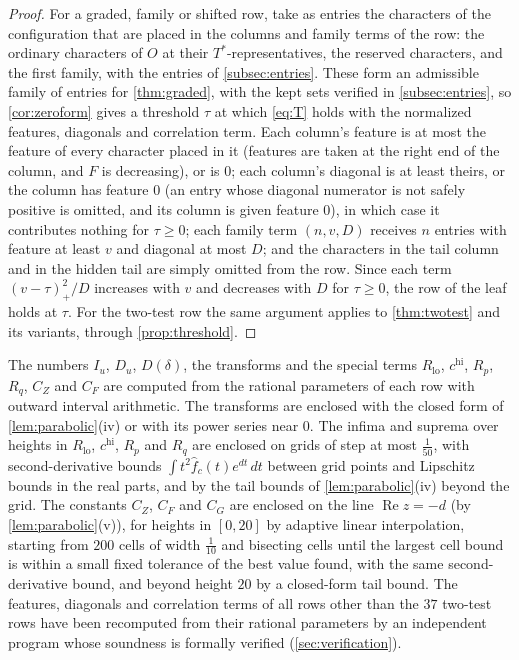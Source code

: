 \documentclass[11pt]{amsart}
\numberwithin{equation}{section}
\theoremstyle{plain}
\theoremstyle{definition}
\theoremstyle{remark}
\renewcommand{\Re}{\operatorname{Re}}
\newcommand{\lo}{\mathrm{lo}}
\newcommand{\hi}{\mathrm{hi}}
\newcommand{\1}{\mathbf{1}}
\begin{document}
\begin{proof}
For a graded, family or shifted row, take as entries the characters of the configuration that
are placed in the columns and family terms of the row: the ordinary characters of $O$ at their
$T^*$-representatives, the reserved characters, and the first family, with the entries of
\cref{subsec:entries}. These form an admissible family of entries for \cref{thm:graded}, with the
kept sets verified in \cref{subsec:entries}, so \cref{cor:zeroform} gives a threshold $\tau$ at
which \eqref{eq:T} holds with the normalized features, diagonals and correlation term. Each column's feature is
at most the feature of every character placed in it (features are taken at the right end of the
column, and $F$ is decreasing), or is $0$; each column's diagonal is at least theirs, or the column
has feature $0$ (an entry whose diagonal numerator is not safely positive is omitted, and its column
is given feature $0$), in which case it contributes nothing for $\tau\ge0$; each family
term $(n,v,D)$ receives $n$ entries with feature at least $v$ and diagonal at most $D$; and the
characters in the tail column and in the hidden tail are simply omitted from the row. Since each term $(v-\tau)_+^2/D$
increases with $v$ and decreases with $D$ for $\tau\ge0$, the row of the leaf holds at $\tau$. For the
two-test row the same argument applies to \cref{thm:twotest} and its variants, through
\cref{prop:threshold}.
\end{proof}

The numbers $I_u$, $D_u$, $D(\delta)$, the transforms and the special terms $R_{\lo}$, $c^{\hi}$, $R_p$, $R_q$,
$C_Z$ and $C_F$ are computed from the rational parameters of each row with outward interval arithmetic. The
transforms are enclosed with the closed form of \cref{lem:parabolic}(iv) or with its power series near
$0$. The infima and suprema over heights in $R_{\lo}$, $c^{\hi}$, $R_p$ and $R_q$ are enclosed on grids of step
at most $\frac1{50}$, with second-derivative bounds $\int t^2\hat f_c(t)e^{dt}\,dt$ between grid points and
Lipschitz bounds in the real parts, and by the tail bounds of \cref{lem:parabolic}(iv) beyond the
grid. The constants $C_Z$, $C_F$ and $C_G$ are enclosed on the line $\Re z=-d$ (by
\cref{lem:parabolic}(v)), for heights in $[0,20]$ by adaptive linear interpolation, starting from
$200$ cells of width $\frac1{10}$ and bisecting cells until the largest cell bound is within a small
fixed tolerance of the best value found, with the same second-derivative bound, and beyond height
$20$ by a closed-form tail bound. The features, diagonals and correlation terms of all rows other than the $37$ two-test rows have been
recomputed from their rational parameters by an independent program whose soundness is formally
verified (\cref{sec:verification}).
\end{document}
